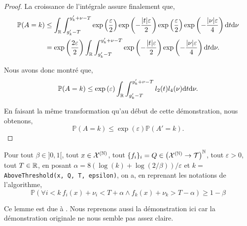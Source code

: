 \begin{proof}
    La croissance de l'intégrale assure finalement que,
    \begin{align*}
        \mathbb P(A = k) & \leq  \int_{\mathbb{R}}\int_{g_k' - T}^{y_k' + \nu - T} \exp\left(\dfrac{\varepsilon}{2}\right)\exp\left(-\dfrac{|t|\varepsilon}{2}\right)\exp\left(\dfrac{\varepsilon}{2}\right)\exp\left(-\dfrac{|\nu|\varepsilon}{4}\right) \mathrm{d}  t \mathrm{d} \nu\\
        & = \exp\left(\dfrac{2\varepsilon}{2}\right)  \int_{\mathbb{R}}\int_{g_k' - T}^{y_k' + \nu -T}\exp\left(-\dfrac{|t|\varepsilon}{2}\right)\exp\left(-\dfrac{|\nu|\varepsilon}{4}\right) \mathrm{d}  t \mathrm{d} \nu.
    \end{align*}

    Nous avons donc montré que,
    \[
        \mathbb P(A = k) \leq \exp\left(\varepsilon\right) \int_{\mathbb{R}}\int_{g_k' - T}^{y_k' + \nu - T}l_2(t)l_4(\nu) \mathrm{d}  t \mathrm{d} \nu.
    \]

    En faisant la même transformation qu'au début de cette démonstration, nous obtenons,
    \[
        \mathbb P(A = k) \leq \exp\left(\varepsilon\right) \mathbb P(A' = k).
    \]
\end{proof}


\begin{lemma}
    \label{atab}
    Pour tout \(\beta \in ]0,1[\), tout \(x \in \mathcal X^{(\mathbb{N})}\), tout \(\{f_i\}_i = Q \in \left( \mathcal X^{(\mathbb{N})} \to  \mathcal T \right)^{\mathbb{N}}\), tout \(\varepsilon > 0\), tout \(T \in \mathbb{R}\),  en posant \(\alpha = 8\left( \log(k) + \log(2/\beta) \right)/\varepsilon\) et \(k = \) \texttt{AboveThreshold(x, Q, T, epsilon)}, on a, en reprenant les notations de l'algorithme,
    \[
        \mathbb P \left( \forall i < k \  f_i(x) + \nu_i < T + \alpha \wedge f_k(x) + \nu_k > T - \alpha \right) \geq 1 - \beta
    \]
\end{lemma}



\begin{remark}
    Ce lemme est due à \cite[page 61]{dwork2014the}. Nous reprenons aussi la démonstration ici car la démonstration originale ne nous semble pas assez claire.
\end{remark}

